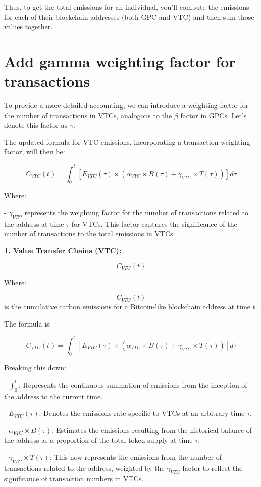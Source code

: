 \documentclass{article}
\begin{document}
Thus, to get the total emissions for an individual, you'll compute the emissions for each of their blockchain addresses (both GPC and VTC) and then sum those values together.

\section{Add gamma weighting factor for transactions}

To provide a more detailed accounting, we can introduce a weighting factor for the number of transactions in VTCs, analogous to the \( \beta \) factor in GPCs. Let's denote this factor as \( \gamma \).

The updated formula for VTC emissions, incorporating a transaction weighting factor, will then be:

\[ C_{VTC}(t) = \int_{0}^{t} [E_{VTC}(\tau) \times (\alpha_{VTC} \times B(\tau) + \gamma_{VTC} \times T(\tau))] d\tau \]

Where:

- \( \gamma_{VTC} \) represents the weighting factor for the number of transactions related to the address at time \( \tau \) for VTCs. This factor captures the significance of the number of transactions to the total emissions in VTCs.


\textbf{1. Value Transfer Chains (VTC):}

\[ C_{VTC}(t) \]

Where:

\[ C_{VTC}(t) \] is the cumulative carbon emissions for a Bitcoin-like blockchain address at time \( t \).

The formula is:

\[ C_{VTC}(t) = \int_{0}^{t} [E_{VTC}(\tau) \times (\alpha_{VTC} \times B(\tau) + \gamma_{VTC} \times T(\tau))] d\tau \]

Breaking this down:

- \( \int_{0}^{t} \): Represents the continuous summation of emissions from the inception of the address to the current time.
  
- \( E_{VTC}(\tau) \): Denotes the emissions rate specific to VTCs at an arbitrary time \( \tau \).
  
- \( \alpha_{VTC} \times B(\tau) \): Estimates the emissions resulting from the historical balance of the address as a proportion of the total token supply at time \( \tau \).
  
- \( \gamma_{VTC} \times T(\tau) \): This now represents the emissions from the number of transactions related to the address, weighted by the \( \gamma_{VTC} \) factor to reflect the significance of transaction numbers in VTCs.
\end{document}
